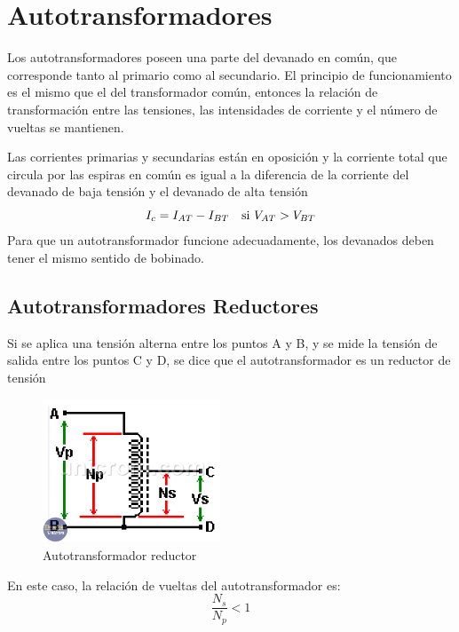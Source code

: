 \documentclass[11pt]{article}
\begin{document}
\section{Autotransformadores}
Los autotransformadores poseen una parte del devanado en común, que corresponde tanto al 
primario como al secundario. 
El principio de funcionamiento es el mismo que el del transformador común, entonces la relación de 
transformación entre las tensiones, las intensidades de corriente y el número de vueltas se mantienen.

Las corrientes primarias y secundarias están en oposición y la corriente total que circula por las espiras
en común es igual a la diferencia de la corriente del devanado de baja tensión y el devanado de alta tensión
\begin{equation}
    I_c = I_{AT} - I_{BT} \quad \textnormal{si } V_{AT} > V_{BT}   
\end{equation}
Para que un autotransformador funcione adecuadamente, los devanados deben tener el mismo sentido de bobinado.

\subsection{Autotransformadores Reductores}
Si se aplica una tensión alterna entre los puntos A y B, y se mide la tensión de salida entre los puntos C y D,
se dice que el autotransformador es un reductor de tensión

\begin{figure}[h]
    \begin{center}
        \includegraphics[width=200px]{autotransformador-reductor.png}
    \end{center}
    \caption{Autotransformador reductor}
\end{figure}

En este caso, la relación de vueltas del autotransformador es:
\begin{equation}
    \frac{N_s}{N_p} < 1 
\end{equation}
\end{document}
